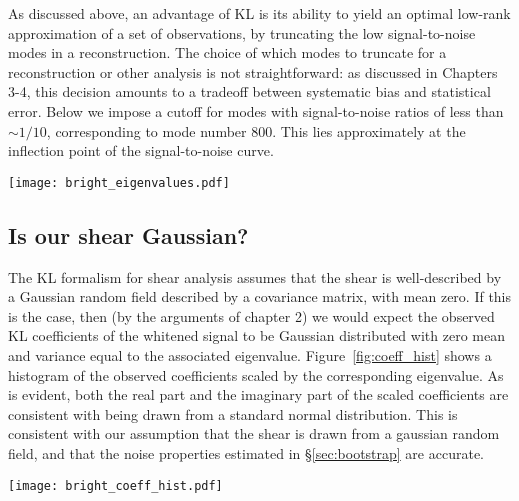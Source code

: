 As discussed above, an advantage of KL is its ability to yield an optimal
low-rank approximation of a set of observations, by truncating the low
signal-to-noise modes in a reconstruction.  The choice of which modes to
truncate for a reconstruction or other analysis is not straightforward:
as discussed in Chapters 3-4, this decision amounts to a tradeoff between
systematic bias and statistical error.  Below we impose a cutoff for
modes with signal-to-noise ratios of less than $\sim 1/10$, corresponding to
mode number 800.  This lies approximately at the inflection point of the
signal-to-noise curve.

\begin{figure*}
 \centering
 \texttt{[image: bright\_eigenvalues.pdf]}
 \caption{
   The distribution of KL eigenvalues for the eigenmodes shown
   in Figure~\ref{fig:eigenmodes}.  There are $41 \times 40 = 1640$
   pixels, but approximately 90 of these contain no sources and are part of
   the mask.  This is reflected in the fact that the final 90 KL modes have
   zero eigenvalue.}
   \label{fig:eigenvalues}
\end{figure*}

\subsection{Is our shear Gaussian?}
The KL formalism for shear analysis assumes that the shear is well-described
by a Gaussian random field described by a covariance matrix, with mean
zero.  If this is the case, then (by the arguments of chapter 2) we would
expect the observed KL coefficients of the whitened signal to be Gaussian
distributed with zero mean and variance equal to the associated eigenvalue.
Figure~\ref{fig:coeff_hist} shows a histogram of the observed coefficients
scaled by the corresponding eigenvalue.  As is evident, both the real
part and the imaginary part of the scaled coefficients are consistent with
being drawn from a standard normal distribution.  This is consistent with
our assumption that the shear is drawn from a gaussian random field, and
that the noise properties estimated in \S\ref{sec:bootstrap} are accurate.

\begin{figure*}
 \centering
 \texttt{[image: bright\_coeff\_hist.pdf]}
 \caption{
   The histogram of normalized coefficients $a_i / \sqrt{\lambda_i}$.
   If the shear is truly a gaussian random field, this distribution should
   be a gaussian with unit variance.
   \label{fig:coeff_hist}}
\end{figure*}


